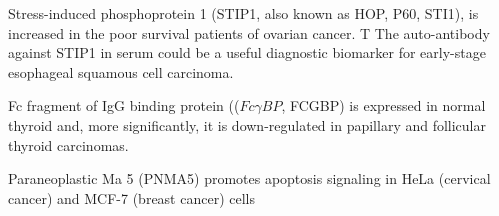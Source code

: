 \documentclass[jpm,article,submit,moreauthors,pdftex]{Definitions/mdpi}
\begin{document}
\begin{paracol}{2}
Stress-induced phosphoprotein 1 (STIP1, also known as HOP, P60, STI1), is increased
in the poor survival patients of ovarian cancer\cite{Chao2013}\cite{Cho2014}. T
The auto-antibody against STIP1 in serum could be a useful diagnostic biomarker for early-stage esophageal squamous cell carcinoma\cite{Xu2017}.







Fc fragment of IgG binding protein (($Fc\gamma BP$, FCGBP) is expressed in normal thyroid and, more significantly, it is down-regulated in papillary and follicular thyroid carcinomas.\cite{ODonovan2002}\cite{Griffith2006}


Paraneoplastic Ma 5 (PNMA5) promotes apoptosis signaling in HeLa (cervical cancer) and MCF-7 (breast cancer) cells\cite{Lee2016}



\end{paracol}
\end{document}
